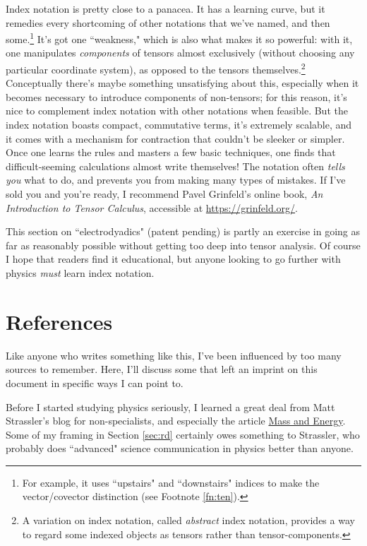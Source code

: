 \documentclass[12pt]{article}
\begin{document}
Index notation is pretty close to a panacea. It has a learning curve, but it remedies every shortcoming of other notations that we've named, and then some.\footnote{For example, it uses ``upstairs" and ``downstairs" indices to make the vector/covector distinction (see Footnote \ref{fn:ten}).} It's got one ``weakness," which is also what makes it so powerful: with it, one manipulates \emph{components} of tensors almost exclusively (without choosing any particular coordinate system), as opposed to the tensors themselves.\footnote{A variation on index notation, called \emph{abstract} index notation, provides a way to regard some indexed objects as tensors rather than tensor-components.} Conceptually there's maybe something unsatisfying about this, especially when it becomes necessary to introduce components of non-tensors; for this reason, it's nice to complement index notation with other notations when feasible. But the index notation boasts compact, commutative terms, it's extremely scalable, and it comes with a mechanism for contraction that couldn't be sleeker or simpler. Once one learns the rules and masters a few basic techniques, one finds that difficult-seeming calculations almost write themselves! The notation often \emph{tells you} what to do, and prevents you from making many types of mistakes. If I've sold you and you're ready, I recommend Pavel Grinfeld's online book, \emph{An Introduction to Tensor Calculus}, accessible at \url{https://grinfeld.org/}.

This section on ``electrodyadics" (patent pending) is partly an exercise in going as far as reasonably possible without getting too deep into tensor analysis. Of course I hope that readers find it educational, but anyone looking to go further with physics \emph{must} learn index notation.

\clearpage

\section*{References}\label{sec:r}

Like anyone who writes something like this, I've been influenced by too many sources to remember. Here, I'll discuss some that left an imprint on this document in specific ways I can point to.

Before I started studying physics seriously, I learned a great deal from Matt Strassler's blog for non-specialists, and especially the article \href{https://profmattstrassler.com/articles-and-posts/particle-physics-basics/mass-energy-matter-etc/mass-and-energy/}{Mass and Energy}. Some of my framing in Section \ref{sec:rd} certainly owes something to Strassler, who probably does ``advanced" science communication in physics better than anyone.
\end{document}
